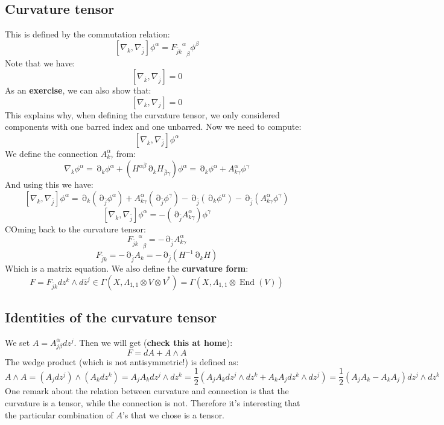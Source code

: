 \documentclass[12 pt]{article}
\DeclareMathOperator {\p} {\partial}
\DeclareMathOperator {\End}{End}
\theoremstyle{plain}
\theoremstyle{definition}
\theoremstyle{remark}
\begin{document}
\subsection*{Curvature tensor}
This is defined by the commutation relation:
\[        [\nabla_k, \nabla_{\bar j} ] \phi^{\alpha} = {{F_{\bar j k}}^{\alpha}}_{\beta} \phi^{\beta}     \]
Note that we have:
\[       [\nabla_{\bar k}, \nabla_{\bar j}] = 0      \]
As an \textbf{exercise}, we can also show that:
\[        [\nabla_k, \nabla_j] = 0      \]
This explains why, when defining the curvature tensor, we only considered components with one barred index and one unbarred. Now we need to compute:
\[       [\nabla_k, \nabla_{\bar j}] \phi^{\alpha}       \]
We define the connection $A^{\alpha}_{k \gamma}$ from:
\[   \nabla_k \phi^{\alpha} = \p_k \phi^{\alpha} + (H^{\alpha \bar \beta} \p_k H_{\bar \beta \gamma}) \phi^{\alpha} = \p_k \phi^{\alpha} +A^{\alpha}_{k \gamma} \phi^{\gamma}   \]
And using this we have:
\[          [\nabla_k, \nabla_{\bar j}] \phi^{\alpha}    = \p_k (\p_{\bar j} \phi^{\alpha}) + A^{\alpha}_{k\gamma} (\p_{\bar j} \phi^{\gamma}) - \p_{\bar j} (\p_k \phi^{\alpha}) -   \p_{\bar j} (A^{\alpha}_{k\gamma} \phi^{\gamma})   \]
\[       [\nabla_k, \nabla_{\bar j}] \phi^{\alpha} = - (\p_{\bar j} A^{\alpha}_{k\gamma}) \phi^{\gamma}     \]
COming back to the curvature tensor:
\[         {{F_{\bar j k}}^{\alpha}}_{\beta} = -  \p_{\bar j} A^{\alpha}_{k\gamma}       \]
\[          F_{\bar j k} = - \p_{\bar j} A_k = - \p_{\bar j} (H^{-1} \p_k H)       \]
Which is a matrix equation. We also define the \textbf{curvature form}:
\[       F =   F_{\bar j k} dz^k \wedge d\bar z^j   \in \Gamma(X, \Lambda_{1,1} \otimes V \otimes V^*) = \Gamma(X, \Lambda_{1,1} \otimes \End(V))    \]

\subsection*{Identities of the curvature tensor}
We set $A = A_{j \beta}^{\alpha} dz^j$. Then we will get (\textbf{check this at home}):
\[      F = dA + A \wedge A     \]
The wedge product (which is not antisymmetric!) is defined as:
\[      A \wedge A = (A_j dz^j) \wedge (A_k dz^k) = A_j A_k dz^j \wedge dz^k = \frac{1}{2} (A_j A_k dz^j \wedge dz^k + A_k A_j dz^k \wedge dz^j) = \frac{1}{2} (A_j A_k - A_k A_j) dz^j \wedge dz^k         \]
One remark about the relation between curvature and connection is that the curvature is a tensor, while the connection is not. Therefore it's interesting that the particular combination of $A$'s that we chose is a tensor.
\end{document}
